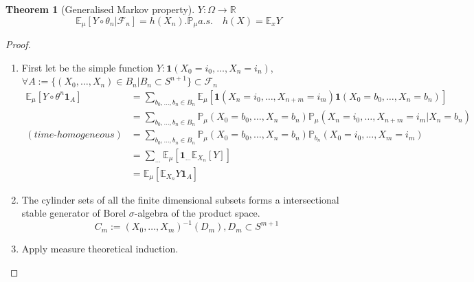 \documentclass[a4paper,11pt]{book}
\newtheorem{theorem}{Theorem}[section]
\theoremstyle{definition}
\theoremstyle{remark}
\begin{document}
\begin{theorem}[Generalised Markov property]
 $Y: \Omega \rightarrow \mathbb{R}$
 	\begin{equation*}
 		\mathbb{E}_\mu[Y \circ \theta_n|\mathcal{F}_n] = h(X_n).\mathbb{P}_\mu a.s. \quad h(X) = \mathbb{E}_x Y  
 	\end{equation*}
\end{theorem}
\begin{proof}\quad
 	\begin{enumerate}
 		\item First let be the simple function  $Y: \textbf{1}(X_0 = i_0, \dots, X_n = i_n)$,  $\forall A:= \{(X_0, \dots, X_n) \in B_n| B_n \subset S^{n+1}\} \subset \mathcal{F}_n$
 		\begin{align*}
 			\mathbb{E}_\mu[Y\circ \theta^n \textbf{1}_A] &= \sum_{b_0, \dots, b_n \in B_n}\mathbb{E}_\mu[\textbf{1}(X_n = i_0, \dots, X_{n+m} = i_m)\textbf{1}(X_0 = b_0, \dots, X_n = b_n)]\\
 			&= \sum_{b_0, \dots, b_n \in B_n}\mathbb{P}_\mu(X_0= b_0, \dots, X_n = b_n)\mathbb{P}_\mu(X_n = i_0, \dots, X_{n+m} = i_m|X_n = b_n)\\
 			(time\text{-}homogeneous)&= \sum_{b_0, \dots, b_n \in B_n}\mathbb{P}_\mu(X_0= b_0, \dots, X_n = b_n) \mathbb{P}_{b_n}(X_0 = i_0, \dots, X_{m} = i_m)\\
 			&= \sum_{\dots}\mathbb{E}_\mu[\textbf{1}_{\dots}\mathbb{E}_{X_n}[Y]]\\
 			&= \mathbb{E}_\mu[\mathbb{E}_{X_n}Y \textbf{1}_A]
 		\end{align*}
 		\item The cylinder sets of all the finite dimensional subsets forms a intersectional stable generator of Borel $\sigma$-algebra of the product space.
 		\begin{equation*}
 			C_m := (X_0, \dots, X_m)^{-1}(D_m), D_m \subset S^{m+1}
 		\end{equation*}
 		\item Apply measure theoretical induction.
 	\end{enumerate}
 \end{proof}
 
\end{document}
